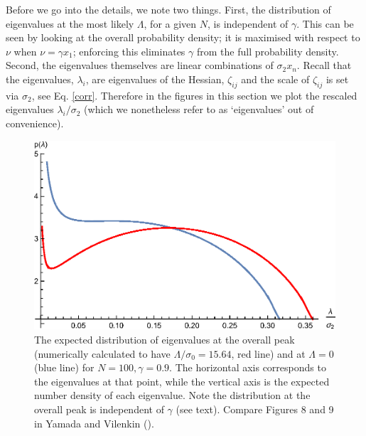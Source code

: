 \documentclass[12pt]{article}
\begin{document}
Before we go into the details, we note two things. First, the distribution of eigenvalues at the most likely $\Lambda$, for a given $N$, is independent of $\gamma$. This can be seen by looking at the overall probability density; it is maximised with respect to $\nu$ when $\nu = \gamma x_1$; enforcing this eliminates $\gamma$ from the full  probability density. Second, the eigenvalues themselves are linear combinations of $\sigma_2x_n$. Recall that the eigenvalues, $\lambda_i$, are eigenvalues of the Hessian, $\zeta_{ij}$ and the scale of $\zeta_{ij}$ is set via $\sigma_2$, see Eq. \eqref{corr}. Therefore in the figures in this section we plot the rescaled eigenvalues $\lambda_i/\sigma_2$ (which we nonetheless refer to as `eigenvalues' out of convenience).

\begin{figure} 
  \centering
  \includegraphics[width=.9\linewidth]{eigendist.eps}
  \caption{The expected distribution of eigenvalues at the overall peak (numerically calculated to have $\Lambda/\sigma_0 = 15.64$, red line) and at $\Lambda=0$ (blue line) for $N=100, \gamma = 0.9$. The horizontal axis corresponds to the eigenvalues at that point, while the vertical axis is the expected number density of each eigenvalue. Note the distribution at the overall peak is independent of $\gamma$ (see text). Compare Figures 8 and 9 in Yamada and Vilenkin (\cite{Yamada2018}).}
  \label{eigendist}
\end{figure}
\end{document}
